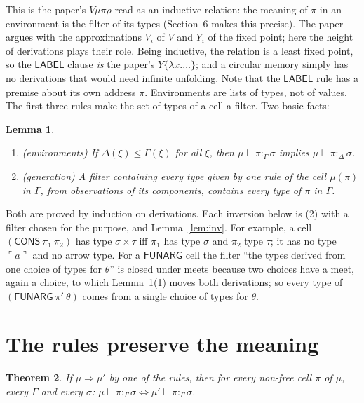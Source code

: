 \documentclass[11pt]{amsart}
\newtheorem{theorem}{Theorem}[section]
\newtheorem{lemma}[theorem]{Lemma}
\theoremstyle{definition}
\theoremstyle{remark}
\newcommand{\kw}[1]{\mathsf{#1}}
\newcommand{\at}[1]{\ulcorner #1\urcorner}
\newcommand{\obs}[4]{#1\vdash #2:_{#3}#4}
\begin{document}
This is the paper's $V\mu\pi\rho$ read as an inductive relation: the meaning
of $\pi$ in an environment is the filter of its types (Section~6 makes this
precise). The paper argues with the approximations $V_i$ of $V$ and $Y_i$ of
the fixed point; here the height of derivations plays their role. Being
inductive, the relation is a least fixed point, so the $\kw{LABEL}$ clause
\emph{is} the paper's $Y\{\lambda x.\ldots\}$; and a circular memory simply
has no derivations that would need infinite unfolding. Note that the
$\kw{LABEL}$ rule has a premise about its own address $\pi$.
Environments are lists of types, not of values. The first three rules make
the set of types of a cell a filter. Two basic facts:

\begin{lemma}\label{lem:basic}
\begin{enumerate}
\item (environments) If $\Delta(\xi)\le\Gamma(\xi)$ for all $\xi$, then
$\obs\mu\pi\Gamma\sigma$ implies $\obs\mu\pi\Delta\sigma$.
\item (generation) A filter containing every type given by one rule of the
cell $\mu(\pi)$ in $\Gamma$, from observations of its components, contains
every type of $\pi$ in $\Gamma$.
\end{enumerate}
\end{lemma}

Both are proved by induction on derivations. Each inversion below is (2)
with a filter chosen for the purpose, and Lemma~\ref{lem:inv}. For example,
a cell $(\kw{CONS}\ \pi_1\ \pi_2)$ has type $\sigma\times\tau$ iff $\pi_1$ has
type $\sigma$ and $\pi_2$ type $\tau$; it has no type $\at a$ and no arrow
type. For a $\kw{FUNARG}$ cell the filter ``the types derived from one choice
of types for $\theta$'' is closed under meets because two choices have a
meet, again a choice, to which Lemma~\ref{lem:basic}(1) moves both
derivations; so every type of $(\kw{FUNARG}\ \pi'\ \theta)$ comes from a
single choice of types for $\theta$.

\section{The rules preserve the meaning}

\begin{theorem}\label{thm:inv}
If $\mu\Rightarrow\mu'$ by one of the rules, then for every non-free cell
$\pi$ of $\mu$, every $\Gamma$ and every $\sigma$:\quad
$\obs\mu\pi\Gamma\sigma\iff\obs{\mu'}\pi\Gamma\sigma$.
\end{theorem}
\end{document}
